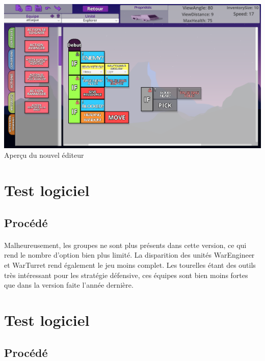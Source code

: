 \documentclass{report}
\begin{document}
\paragraph{}
\begin{adjustwidth}{-5.5em}{-5.5em}
\begin{center}
\includegraphics[scale=0.35]{DATA/editeurNew.png}
 {Aperçu du nouvel éditeur}
\end{center}
\end{adjustwidth}
\paragraph{}
\section{Test logiciel}
\subsection{Procédé}
\paragraph{}

Malheureusement, les groupes ne sont plus présents dans cette version, ce qui rend le nombre d’option bien plus limité.\newline
La disparition des unités WarEngineer et WarTurret rend également le jeu moins complet. Les tourelles étant des outils très intéressant pour les stratégie défensive, ces équipes sont bien moins fortes que dans la version faite l’année dernière.
\section{Test logiciel}
\subsection{Procédé}
\end{document}
